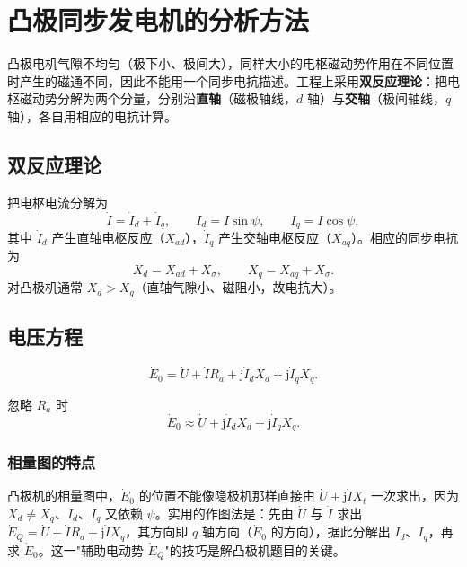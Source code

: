 \section{凸极同步发电机的分析方法}

凸极电机气隙不均匀（极下小、极间大），同样大小的电枢磁动势作用在不同位置时产生的磁通不同，因此不能用一个同步电抗描述。工程上采用\textbf{双反应理论}：把电枢磁动势分解为两个分量，分别沿\textbf{直轴}（磁极轴线，$d$ 轴）与\textbf{交轴}（极间轴线，$q$ 轴），各自用相应的电抗计算。

\subsection{双反应理论}
把电枢电流分解为
\begin{equation}
\dot I=\dot I_d+\dot I_q,\qquad
I_d=I\sin\psi,\qquad I_q=I\cos\psi ,
\end{equation}
其中 $\dot I_d$ 产生直轴电枢反应（$X_{ad}$），$\dot I_q$ 产生交轴电枢反应（$X_{aq}$）。相应的同步电抗为
\begin{equation}
X_d=X_{ad}+X_\sigma,\qquad X_q=X_{aq}+X_\sigma .
\end{equation}
对凸极机通常 $X_d>X_q$（直轴气隙小、磁阻小，故电抗大）。

\subsection{电压方程}
\begin{equation}
\dot E_0=\dot U+\dot I R_a+\mathrm{j}\dot I_dX_d+\mathrm{j}\dot I_qX_q .
\end{equation}


忽略 $R_a$ 时
\begin{equation}
\dot E_0\approx\dot U+\mathrm{j}\dot I_dX_d+\mathrm{j}\dot I_qX_q .
\end{equation}

\subsubsection{相量图的特点}
凸极机的相量图中，$\dot E_0$ 的位置不能像隐极机那样直接由 $\dot U+\mathrm{j}\dot I X_t$ 一次求出，因为 $X_d\ne X_q$、$I_d$、$I_q$ 又依赖 $\psi$。实用的作图法是：先由 $\dot U$ 与 $\dot I$ 求出 $\dot E_Q=\dot U+\dot I R_a+\mathrm{j}\dot I X_q$，其方向即 $q$ 轴方向（$\dot E_0$ 的方向），据此分解出 $I_d$、$I_q$，再求 $\dot E_0$。这一"辅助电动势 $\dot E_Q$"的技巧是解凸极机题目的关键。

